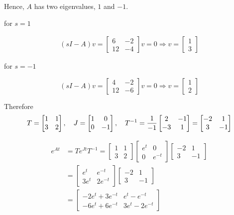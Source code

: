 \documentclass[12pt,a4paper]{article}
\begin{document}
Hence, $A$ has two eigenvalues, $1$ and $-1$.

for $s = 1$

\begin{align*}
	(sI - A)v = \begin{bmatrix}
		6 & -2 \\ 12 & -4
	\end{bmatrix}v = 0 \Rightarrow v = \begin{bmatrix}
	1 \\ 3
	\end{bmatrix}
\end{align*}

for $ s= -1$

\[
(sI - A)v = \begin{bmatrix}
	4 & -2 \\ 12 & -6
\end{bmatrix}v = 0 \Rightarrow v=\begin{bmatrix}
1 \\ 2
\end{bmatrix}
\]

Therefore
\[
T = \begin{bmatrix}
	1 & 1 \\
	3 & 2
\end{bmatrix}, \quad J = \begin{bmatrix}
1 & 0 \\ 0 & -1
\end{bmatrix}, \quad T^{-1} = {1\over -1} \begin{bmatrix}
2 & -1 \\ -3 & 1
\end{bmatrix} = \begin{bmatrix}
-2 & 1 \\ 3 & -1
\end{bmatrix}
\]

\begin{align*}
e^{At} &= T e^{Jt} T^{-1} = \begin{bmatrix}
	1 & 1 \\ 3 & 2 
\end{bmatrix}	\begin{bmatrix}
e^{t} & 0 \\ 0 & e^{-t}
\end{bmatrix}\begin{bmatrix}
-2 & 1 \\ 3 & -1
\end{bmatrix} \\
&= \begin{bmatrix}
	e^{t} & e^{-t} \\
	3e^{t} & 2e^{-t}
\end{bmatrix}\begin{bmatrix}
-2 & 1 \\ 3 & -1
\end{bmatrix} \\
&= \begin{bmatrix}
	-2e^{t} + 3e^{-t} & e^{t} -e^{-t} \\
	-6e^{t} + 6e^{-t} & 3e^{t}-2e^{-t}
\end{bmatrix}
\end{align*}
\end{document}
